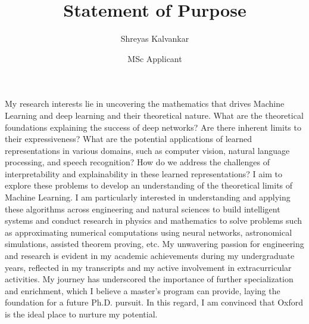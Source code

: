 \documentclass{article}
\title{Statement of Purpose}
\author{Shreyas Kalvankar}
\date{MSc Applicant}
\begin{document}
  \maketitle%
  \thispagestyle{empty}

  \vspace{5pt}
\hspace{0.25in}My research interests lie in uncovering the mathematics that
drives Machine Learning and deep learning and their theoretical nature. What are
the theoretical foundations explaining the success of deep networks? Are there
inherent limits to their expressiveness? What are the potential applications of
learned representations in various domains, such as computer vision, natural
language processing, and speech recognition? How do we address the challenges of
interpretability and explainability in these learned representations? I aim to
explore these problems to develop an understanding of the theoretical limits of
Machine Learning. I am particularly interested in understanding and applying
these algorithms across engineering and natural sciences to build intelligent
systems and conduct research in physics and mathematics to solve problems such
as approximating numerical computations using neural networks, astronomical
simulations, assisted theorem proving, etc. My unwavering passion for
engineering and research is evident in my academic achievements during my
undergraduate years, reflected in my transcripts and my active involvement in
extracurricular activities. My journey has underscored the importance of further
specialization and enrichment, which I believe a master's program can provide,
laying the foundation for a future Ph.D. pursuit. In this regard, I am convinced
that Oxford is the ideal place to nurture my potential.
\end{document}
